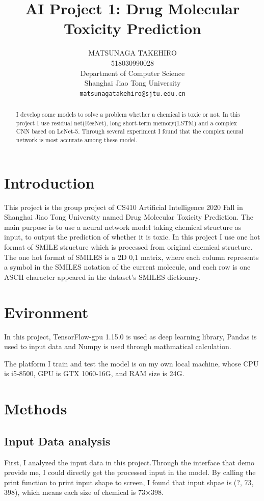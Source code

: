 \documentclass{article}
\title{AI Project 1: Drug Molecular Toxicity Prediction}
\author{
MATSUNAGA TAKEHIRO \\
518030990028\\
Department of Computer Science\\
Shanghai Jiao Tong University\\
\texttt{matsunagatakehiro@sjtu.edu.cn} \\
}
\begin{document}
\maketitle

\begin{abstract}
 I develop some models to solve a problem whether a chemical is toxic or not. In this project I use residual net(ResNet), long short-term memory(LSTM) and a complex CNN based on LeNet-5. Through several experiment I found that the complex neural network is most accurate among these model.
\end{abstract}

\section{Introduction}
This project is the group project of CS410 Artificial Intelligence 2020 Fall in Shanghai Jiao Tong University named Drug Molecular Toxicity Prediction. The main purpose is to use a neural network model taking chemical structure as input, to output the prediction of whether it is toxic. In this project I use one hot format of SMILE structure which is processed from original chemical structure. The one hot format of SMILES is a 2D {0,1} matrix, where each column represents a symbol in the SMILES notation of the current molecule, and each row is one ASCII character appeared in the dataset’s SMILES dictionary.

\section{Evironment}
In this project, TensorFlow-gpu 1.15.0 is used as deep learning library, Pandas is used to input data and Numpy is used through mathmatical calculation.

The platform I train and test the model is on my own local machine, whose CPU is i5-8500, GPU is GTX 1060-16G, and RAM size is 24G.

\section{Methods}
\subsection{Input Data analysis}
First, I analyzed the input data in this project.Through the interface that demo provide me, I could directly get the processed input in the model. By calling the print function to print input shape to screen, I found that input shpae is (?, 73, 398), which means each size of chemical is 73$\times$398. 
\end{document}
